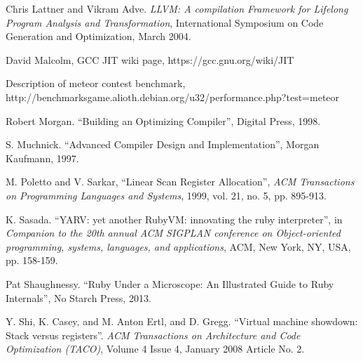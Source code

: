 \documentclass[preprint]{sigplanconf}
\begin{document}
\begin{thebibliography}{}
Chris Lattner and Vikram Adve.  \emph{LLVM: A compilation
  Framework for Lifelong Program Analysis and Transformation},
International Symposium on Code Generation and Optimization, March
2004.

 David Malcolm, GCC JIT wiki page,
https://gcc.gnu.org/wiki/JIT
  
  Description of meteor contest benchmark,
  http://benchmarksgame.alioth.debian.org/u32/performance.php?test=meteor
  
 Robert Morgan.  ``Building an Optimizing
  Compiler'',  Digital Press, 1998.

 S. Muchnick. ``Advanced Compiler Design and
  Implementation'',  Morgan Kaufmann, 1997.

M. Poletto and V. Sarkar, ``Linear Scan Register Allocation'',
\emph{ACM Transactions on Programming Languages and Systems}, 1999,
vol. 21, no. 5, pp. 895-913.
      
K. Sasada. ``YARV: yet another RubyVM: innovating the ruby
interpreter'', in \emph{Companion to the 20th annual ACM SIGPLAN
conference on Object-oriented programming, systems, languages, and
applications}, ACM, New York, NY, USA, pp. 158-159.

Pat Shaughnessy. ``Ruby Under a Microscope: An Illustrated Guide to
Ruby Internals'', No Starch Press, 2013.
  
Y. Shi, K. Casey, and M. Anton Ertl, and D. Gregg. ``Virtual machine
showdown: Stack versus registers''. \emph{ACM Transactions on Architecture
 and Code Optimization (TACO)}, Volume 4 Issue 4, January 2008
Article No. 2.

\end{thebibliography}
\end{document}
